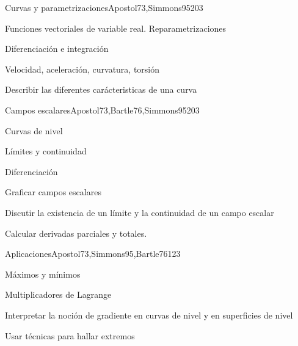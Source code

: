 \begin{syllabus}
\begin{unit}{Curvas y parametrizaciones}{Apostol73,Simmons95}{20}{3}
   \begin{topics}
      \item Funciones vectoriales de variable real. Reparametrizaciones
      \item Diferenciación e integración
      \item Velocidad, aceleración, curvatura, torsión
      \end{topics}

   \begin{unitgoals}
      \item Describir las diferentes carácteristicas de una curva
      \end{unitgoals}
\end{unit}

\begin{unit}{Campos escalares}{Apostol73,Bartle76,Simmons95}{20}{3}
   \begin{topics}
      \item Curvas de nivel
      \item Límites y continuidad
      \item Diferenciación
      \end{topics}

   \begin{unitgoals}
      \item Graficar campos escalares
      \item Discutir la existencia de un límite y la continuidad de un campo escalar
      \item Calcular derivadas parciales y totales.
      \end{unitgoals}
\end{unit}

\begin{unit}{Aplicaciones}{Apostol73,Simmons95,Bartle76}{12}{3}
   \begin{topics}
      \item Máximos y mínimos
      \item Multiplicadores de Lagrange
      \end{topics}

   \begin{unitgoals}
      \item Interpretar la noción de gradiente en curvas de nivel y en superficies de nivel
      \item Usar técnicas para hallar extremos
      \end{unitgoals}
\end{unit}


\end{syllabus}
